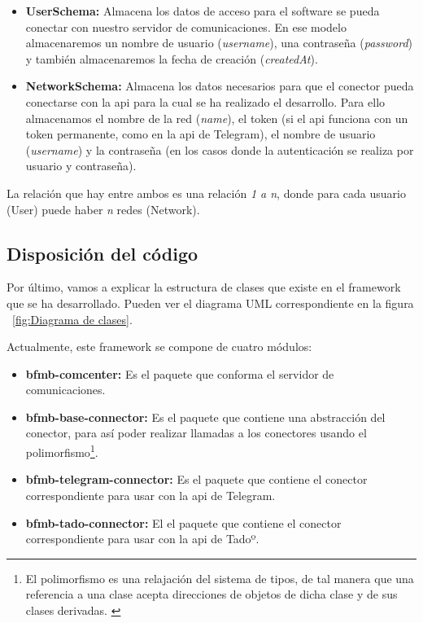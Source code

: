 \documentclass[spanish,12pt, a4paper, twoside]{paper}
\begin{document}
\begin{itemize}
\item\textbf{UserSchema:} Almacena los datos de acceso para el software se pueda conectar con nuestro servidor de comunicaciones. En ese modelo almacenaremos un nombre de usuario (\emph{username}), una contraseña (\emph{password}) y también almacenaremos la fecha de creación (\emph{createdAt}).

\item\textbf{NetworkSchema:} Almacena los datos necesarios para que el conector pueda conectarse con la api para la cual se ha realizado el desarrollo. Para ello almacenamos el nombre de la red (\emph{name}), el token (si el api funciona con un token permanente, como en la api de Telegram), el nombre de usuario (\emph{username}) y la contraseña (en los casos donde la autenticación se realiza por usuario y contraseña).
\end{itemize}

La relación que hay entre ambos es una relación \emph{1 a n}, donde para cada usuario (User) puede haber \emph{n} redes (Network).

\subsection{Disposición del código}

Por último, vamos a explicar la estructura de clases que existe en el framework que se ha desarrollado. Pueden ver el diagrama UML correspondiente en la figura ~\ref{fig:Diagrama de clases}.

Actualmente, este framework se compone de cuatro módulos:

\begin{itemize}
\item\textbf{bfmb-comcenter:} Es el paquete que conforma el servidor de comunicaciones.
\item\textbf{bfmb-base-connector:} Es el paquete que contiene una abstracción del conector, para así poder realizar llamadas a los conectores usando el polimorfismo\footnote{El polimorfismo es una relajación del sistema de tipos, de tal manera que una referencia a una clase acepta direcciones de objetos de dicha clase y de sus clases derivadas. \cite[Def. académica de Fernández, L.]{PgWebPolimorfismo}}.
\item\textbf{bfmb-telegram-connector:} Es el paquete que contiene el conector correspondiente para usar con la api de Telegram.
\item\textbf{bfmb-tado-connector:} El el paquete que contiene el conector correspondiente para usar con la api de Tadoº.
\end{itemize}
\end{document}
